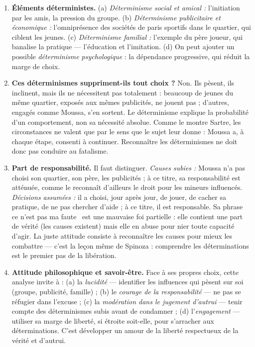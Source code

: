 \documentclass[11pt]{article}
\begin{document}
\begin{corrige}
\begin{enumerate}
\item \textbf{Éléments déterministes.} (a) \emph{Déterminisme social et amical :} l'initiation par les amis, la pression du groupe. (b) \emph{Déterminisme publicitaire et économique :} l'omniprésence des sociétés de paris sportifs dans le quartier, qui ciblent les jeunes. (c) \emph{Déterminisme familial :} l'exemple du père joueur, qui banalise la pratique — l'éducation et l'imitation. (d) On peut ajouter un possible \emph{déterminisme psychologique} : la dépendance progressive, qui réduit la marge de choix.
\item \textbf{Ces déterminismes suppriment-ils tout choix ?} Non. Ils pèsent, ils inclinent, mais ils ne nécessitent pas totalement : beaucoup de jeunes du même quartier, exposés aux mêmes publicités, ne jouent pas ; d'autres, engagés comme Moussa, s'en sortent. Le déterminisme explique la probabilité d'un comportement, non sa nécessité absolue. Comme le montre Sartre, les circonstances ne valent que par le sens que le sujet leur donne : Moussa a, à chaque étape, consenti à continuer. Reconnaître les déterminismes ne doit donc pas conduire au fatalisme.
\item \textbf{Part de responsabilité.} Il faut distinguer. \emph{Causes subies :} Moussa n'a pas choisi son quartier, son père, les publicités ; à ce titre, sa responsabilité est atténuée, comme le reconnaît d'ailleurs le droit pour les mineurs influencés. \emph{Décisions assumées :} il a choisi, jour après jour, de jouer, de cacher sa pratique, de ne pas chercher d'aide ; à ce titre, il est responsable. Sa phrase \guillemotleft ce n'est pas ma faute \guillemotright\ est une mauvaise foi partielle : elle contient une part de vérité (les causes existent) mais elle en abuse pour nier toute capacité d'agir. La juste attitude consiste à reconnaître les causes pour mieux les combattre — c'est la leçon même de Spinoza : comprendre les déterminations est le premier pas de la libération.
\item \textbf{Attitude philosophique et savoir-être.} Face à ses propres choix, cette analyse invite à : (a) la \emph{lucidité} — identifier les influences qui pèsent sur soi (groupe, publicité, famille) ; (b) le \emph{courage de la responsabilité} — ne pas se réfugier dans l'excuse ; (c) la \emph{modération dans le jugement d'autrui} — tenir compte des déterminismes subis avant de condamner ; (d) l'\emph{engagement} — utiliser sa marge de liberté, si étroite soit-elle, pour s'arracher aux déterminations. C'est développer un amour de la liberté respectueux de la vérité et d'autrui.
\end{enumerate}
\end{corrige}
\end{document}
